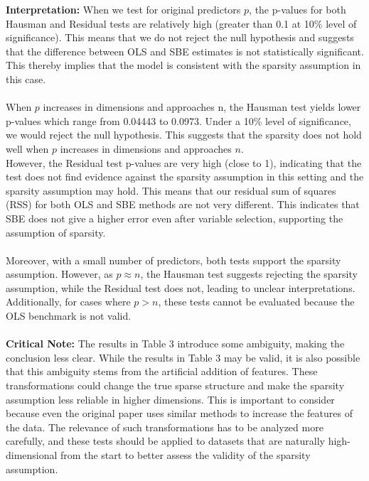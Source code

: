 \textbf{Interpretation:} When we test for original predictors $p$, the p-values for both Hausman and Residual tests are relatively high (greater than 0.1 at 10\% level of significance). This means that we do not reject the null hypothesis and suggests that the difference between OLS and SBE estimates is not statistically significant. This thereby implies that the model is consistent with the sparsity assumption in this case. \\
\\
When $p$ increases in dimensions and approaches n, the Hausman test yields lower p-values which range from 0.04443 to 0.0973. Under a 10\% level of significance, we would reject the null hypothesis. This suggests that the sparsity does not hold well when $p$ increases in dimensions and approaches $n$.\\
However, the Residual test p-values are very high (close to 1), indicating that the test does not find evidence against the sparsity assumption in this setting and the sparsity assumption may hold. This means that our residual sum of squares (RSS) for both OLS and SBE methods are not very different. This indicates that SBE does not give a higher error even after variable selection, supporting the assumption of sparsity.\\
\\
Moreover, with a small number of predictors, both tests support the sparsity assumption. However, as $p \approx n$, the Hausman test suggests rejecting the sparsity assumption, while the Residual test does not, leading to unclear interpretations. Additionally, for cases where $p>n$, these tests cannot be evaluated because the OLS benchmark is not valid.\\
\\
\textbf{Critical Note:} The results in Table 3 introduce some ambiguity, making the conclusion less clear. While the results in Table 3 may be valid, it is also possible that this ambiguity stems from the artificial addition of features. These transformations could change the true sparse structure and make the sparsity assumption less reliable in higher dimensions. This is important to consider because even the original paper uses similar methods to increase the features of the data. The relevance of such transformations has to be analyzed more carefully, and these tests should be applied to datasets that are naturally high-dimensional from the start to better assess the  validity of the sparsity assumption. 